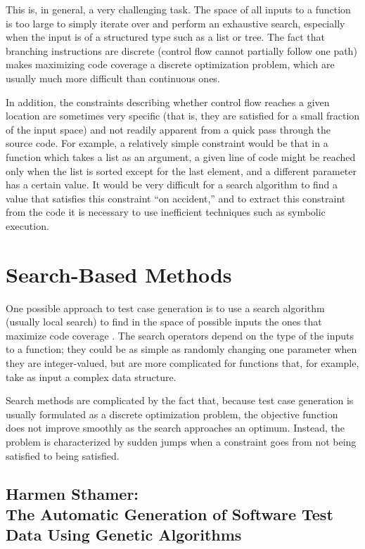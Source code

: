 \documentclass{sig-alternate-05-2015}
\begin{document}
This is, in general, a very challenging task. The space of all inputs to a
function is too large to simply iterate over and perform an exhaustive search,
especially when the input is of a structured type such as a list or tree. The
fact that branching instructions are discrete (control flow cannot partially
follow one path) makes maximizing code coverage a discrete optimization
problem, which are usually much more difficult than continuous ones.

In addition, the constraints describing whether control flow reaches a given
location are sometimes very specific (that is, they are satisfied for a small
fraction of the input space) and not readily apparent from a quick pass through
the source code. For example, a relatively simple constraint would be that in a
function which takes a list as an argument, a given line of code might be
reached only when the list is sorted except for the last element, and a
different parameter has a certain value. It would be very difficult for a
search algorithm to find a value that satisfies this constraint ``on
accident,'' and to extract this constraint from the code it is necessary to use
inefficient techniques such as symbolic execution.

\section{Search-Based Methods}

One possible approach to test case generation is to use a search algorithm
(usually local search) to find in the space of possible inputs the ones that
maximize code coverage \cite{anand}. The search operators depend on the type of
the inputs
to a function; they could be as simple as randomly changing one parameter when
they are integer-valued, but are more complicated for functions that, for
example, take as input a complex data structure.

Search methods are complicated by the fact that, because test case generation
is usually formulated as a discrete optimization problem, the objective
function does not improve smoothly as the search approaches an optimum.
Instead, the problem is characterized by sudden jumps when a constraint goes
from not being satisfied to being satisfied.

\subsection{Harmen Sthamer: \\The Automatic Generation of Software Test Data
            Using Genetic Algorithms}
\end{document}
